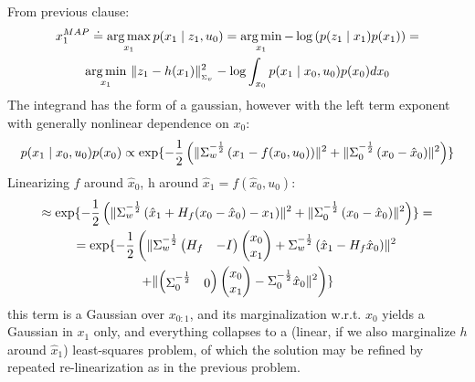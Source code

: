 \documentclass[a4paper]{scrreprt}
\begin{document}
\section{}
From previous clause: 
\begin{gather}
	x_1^{MAP} \doteq \argmax_{x_1} p(x_1\mid z_1, u_0) = \argmin_{x_1}
	-\log\left(p(z_1\mid x_1) p(x_1)\right) = \\
	\argmin_{x_1}\, \nrmsq{_{\Sigma_v}}{z_1-h(x_1)} -\log \int_{x_0} p(x_1\mid 
	x_0, u_0) p(x_0) dx_0
\end{gather}
The integrand has the form of a gaussian, however with the left term exponent 
with generally nonlinear dependence on $x_0$: 
\begin{gather}
	p(x_1\mid 
		x_0, u_0) p(x_0)\propto \exp 
		\{-\frac{1}{2}\left(\nrmsq{}{\Sigma_w^{-\frac{1}{2}}\left(x_1-f(x_0,u_0)\right)}+
		\nrmsq{}{\Sigma_0^{-\frac{1}{2}}\left(x_0-\hat{x}_0\right)}\right)\}
\end{gather}
Linearizing $f$ around $\hat{x}_0$, h around $\hat{x}_1 = f(\hat{x}_0, u_0)$: 
\begin{gather}
	\approx  \exp 
			\{-\frac{1}{2}\left(\nrmsq{}{\Sigma_w^{-\frac{1}{2}}\left(\hat{x}_1+H_f(x_0-\hat{x}_0)-x_1\right)}+
			\nrmsq{}{\Sigma_0^{-\frac{1}{2}}\left(x_0-\hat{x}_0\right)}\right)\}
			 = \\
			=  \exp 	
			\{-\frac{1}{2}\left(\nrmsq{}{\Sigma_w^{-\frac{1}{2}}
			\begin{pmatrix}
			H_f & -I
			\end{pmatrix} \begin{pmatrix}
			x_0 \\ x_1
			\end{pmatrix}
			+ 
			\Sigma_w^{-\frac{1}{2}}\left(\hat{x}_1-H_f\hat{x}_0\right)} \right. 
			\\ \left.
			+ \nrmsq{}{ 
			\begin{pmatrix}
				\Sigma_0^{-\frac{1}{2}} & 0 
			\end{pmatrix}
			\begin{pmatrix}
			x_0 \\ x_1
			\end{pmatrix}			
			-\Sigma_0^{-\frac{1}{2}}\hat{x}_0}
			\right) \}
			\label{eq:integrand-gaussian}
\end{gather}
 this term is a 
Gaussian over $x_{0:1}$, and its marginalization w.r.t. $x_0$ yields a Gaussian 
in $x_1$ only, and everything collapses to a (linear, if we also marginalize 
$h$ around $\hat{x}_1$) least-squares problem, of which the solution may be 
refined by repeated 
re-linearization as in the previous problem. 
\end{document}
